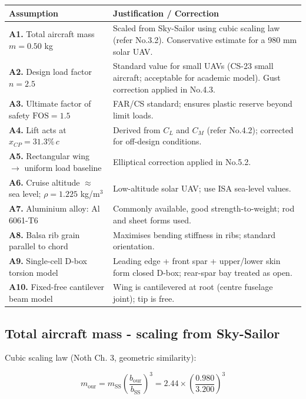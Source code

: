\documentclass[10pt,a4paper]{article}
\begin{document}
\begin{center}
\renewcommand{\arraystretch}{1.2}
\begin{tabularx}{\textwidth}{|p{4cm}|X|}
\hline
Assumption & Justification / Correction \\
\hline
\textbf{A1.} Total aircraft mass $m = 0.50$ kg & Scaled from Sky-Sailor using cubic scaling law (refer No.3.2). Conservative estimate for a 980 mm solar UAV. \\
\hline
\textbf{A2.} Design load factor $n = 2.5$ & Standard value for small UAVs (CS-23 small aircraft; acceptable for academic model). Gust correction applied in No.4.3. \\
\hline
\textbf{A3.} Ultimate factor of safety $\mathrm{FOS} = 1.5$ & FAR/CS standard; ensures plastic reserve beyond limit loads. \\
\hline
\textbf{A4.} Lift acts at $x_{CP} = 31.3\%\,c$ & Derived from $C_L$ and $C_M$ (refer No.4.2); corrected for off-design conditions. \\
\hline
\textbf{A5.} Rectangular wing $\rightarrow$ uniform load baseline & Elliptical correction applied in No.5.2. \\
\hline
\textbf{A6.} Cruise altitude $\approx$ sea level; $\rho = 1.225$ kg/m$^{3}$ & Low-altitude solar UAV; use ISA sea-level values. \\
\hline
\textbf{A7.} Aluminium alloy: Al 6061-T6 & Commonly available, good strength-to-weight; rod and sheet forms used. \\
\hline
\textbf{A8.} Balsa rib grain parallel to chord & Maximises bending stiffness in ribs; standard orientation. \\
\hline
\textbf{A9.} Single-cell D-box torsion model & Leading edge + front spar + upper/lower skin form closed D-box; rear-spar bay treated as open. \\
\hline
\textbf{A10.} Fixed-free cantilever beam model & Wing is cantilevered at root (centre fuselage joint); tip is free. \\
\hline
\end{tabularx}
\end{center}

\subsection{Total aircraft mass - scaling from Sky-Sailor}


Cubic scaling law (Noth Ch. 3, geometric similarity):

\[
m_{\text{our}} = m_{\text{SS}} \left(\frac{b_{\text{our}}}{b_{\text{SS}}}\right)^3 = 2.44 \times \left(\frac{0.980}{3.200}\right)^3
\]
\end{document}
